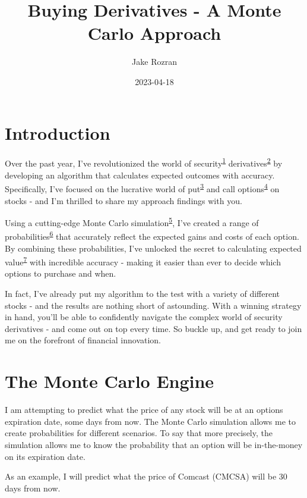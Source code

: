 \documentclass[
]{book}
\title{Buying Derivatives - A Monte Carlo Approach}
\author{Jake Rozran}
\date{2023-04-18}
\begin{document}
\maketitle

{
\setcounter{tocdepth}{1}
\tableofcontents
}
\hypertarget{intro}{%
\chapter{Introduction}\label{intro}}

Over the past year, I've revolutionized the world of security\textsuperscript{\protect\hyperlink{def}{1}}
derivatives\textsuperscript{\protect\hyperlink{def}{2}} by developing an algorithm that calculates expected
outcomes with accuracy. Specifically, I've focused on the lucrative world of
put\textsuperscript{\protect\hyperlink{def}{3}} and call options\textsuperscript{\protect\hyperlink{def}{4}} on stocks - and I'm thrilled to share
my approach findings with you.

Using a cutting-edge Monte Carlo simulation\textsuperscript{\protect\hyperlink{def}{5}}, I've created a range of
probabilities\textsuperscript{\protect\hyperlink{def}{6}} that accurately reflect the expected gains and costs of
each option. By combining these probabilities, I've unlocked the secret to
calculating expected value\textsuperscript{\protect\hyperlink{def}{7}} with incredible accuracy - making it
easier than ever to decide which options to purchase and when.

In fact, I've already put my algorithm to the test with a variety of different
stocks - and the results are nothing short of astounding. With a winning
strategy in hand, you'll be able to confidently navigate the complex world of
security derivatives - and come out on top every time. So buckle up, and get
ready to join me on the forefront of financial innovation.

\hypertarget{mc}{%
\chapter{The Monte Carlo Engine}\label{mc}}

I am attempting to predict what the price of any stock will be at an options
expiration date, some days from now. The Monte Carlo simulation allows me to
create probabilities for different scenarios. To say that more precisely, the
simulation allows me to know the probability that an option will be in-the-money
on its expiration date.

As an example, I will predict what the price of Comcast (CMCSA) will be 30 days
from now.
\end{document}
